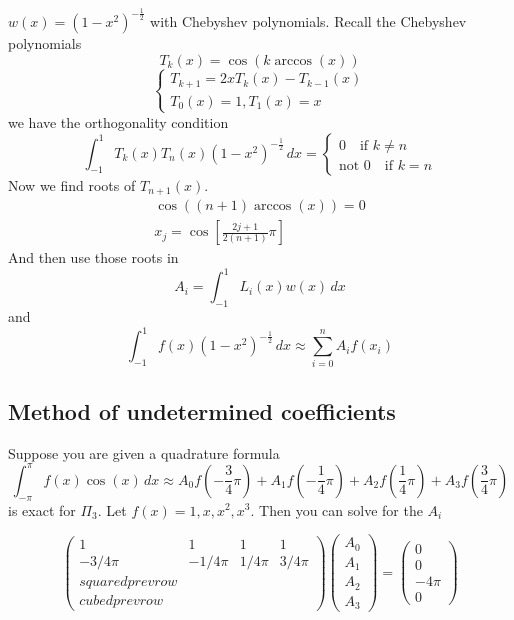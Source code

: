 \documentclass[11pt]{article}
\begin{document}
\begin{example}
    $w(x) = (1-x^2)^{-\frac{1}{2}}$ with Chebyshev polynomials. Recall the Chebyshev polynomials
    \[
        T_k(x) = \cos(k\arccos(x))
    \]
    \[
        \begin{cases}
            T_{k+1}= 2xT_k(x) - T_{k-1}(x) \\
             T_0(x) = 1, T_1(x) = x
        \end{cases}
    \]
    we have the orthogonality condition
    \[
        \int_{-1}^{1} T_k(x)T_n(x)(1-x^2)^{-\frac{1}{2}}\, dx = 
        \begin{cases}
            0 \quad \text{if } k \ne n \\
            \text{not } 0 \quad \text{if } k = n 
        \end{cases}
    \]
    Now we find roots of $T_{n+1}(x)$.
    \begin{align*}
        \cos((n+1)\arccos(x)) = 0 \\
        x_j = \cos\left[\frac{2j+1}{2(n+1)}\pi\right] 
    \end{align*}
    And then use those roots in 
    \[
        A_i = \int_{-1}^{1} L_i(x)w(x)\, dx
    \]
    and 
    \[
        \int_{-1}^{1} f(x)(1-x^2)^{-\frac{1}{2}}\, dx \approx \sum_{i=0}^{n} A_i f(x_i)
    \]

\end{example}

\subsection{Method of undetermined coefficients}
Suppose you are given a quadrature formula
\[
    \int_{-\pi}^{\pi}f(x) \cos(x) \, dx \approx A_0 f(-\frac{3}{4}\pi) + A_1 f(-\frac{1}{4}\pi)+ A_2f(\frac{1}{4}\pi)+A_3f(\frac{3}{4}\pi)
\]
is exact for $\Pi_3$. Let $f(x) = 1, x, x^2, x^3$. Then you can solve for the $A_i$

\[
    \begin{pmatrix}
        1 & 1 & 1 & 1\\
        -3/4 \pi & -1/4 \pi & 1/4 \pi & 3/4 \pi \\
        squared prev row \\
        cubed prev row
    \end{pmatrix}
    \begin{pmatrix}
        A_0 \\
        A_1 \\
        A_2  \\
        A_3
    \end{pmatrix}
    =
    \begin{pmatrix}
        0 \\
        0 \\
        - 4 \pi\\
        0
    \end{pmatrix}
\]
\end{document}
